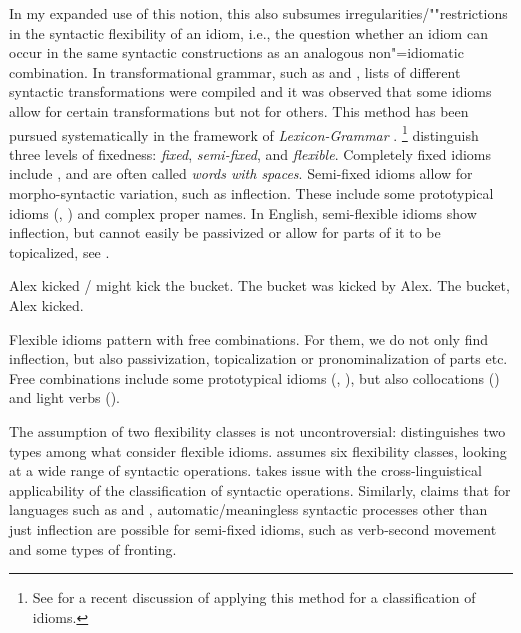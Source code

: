 \documentclass[output=paper]{langsci/langscibook}
\begin{document}
In my expanded use of this notion, this also subsumes irregularities/""restrictions in the syntactic flexibility of an idiom, i.e., the question whether an idiom can occur in the same syntactic constructions as an analogous non"=idiomatic combination. In transformational grammar, such as \cite{Weinreich:69} and \cite{Fraser:70}, lists of different syntactic transformations were compiled and it was observed that some idioms allow for certain transformations but not for others. This method has been pursued systematically in the framework of \emph{Lexicon-Grammar} \citep{Gross:75}.%
\footnote{See \cite{Laporte:18} for a recent discussion of applying this method for a classification of idioms.}
%
\cite{SBBCF2002a-ausgedruckt} distinguish three levels of fixedness: \emph{fixed}, \emph{semi-fixed}, and \emph{flexible}. 
Completely fixed idioms include ,  and are often called \emph{words with spaces}.
Semi-fixed idioms allow for morpho-syntactic variation, such as inflection. These include some prototypical idioms (, ) and complex proper names. In English, semi-flexible idioms show inflection, but cannot easily be passivized or allow for parts of it to be topicalized, see .

\eal \label{kick-ex} 
\ex Alex kicked / might kick the bucket.
\ex *The bucket was kicked by Alex.
\ex *The bucket, Alex kicked.
\zl 



Flexible idioms pattern with free combinations. For them, we do not only find inflection, but also passivization, topicalization or pronominalization of parts etc. Free combinations include some prototypical idioms (, ), but also collocations () and light verbs ().

The assumption of two flexibility classes is not uncontroversial: 
\cite{Horn:03} distinguishes two types among what \cite{SBBCF2002a-ausgedruckt} consider flexible idioms. 
\cite{Fraser:70} assumes six flexibility classes, looking at a wide range of syntactic operations.
\cite{Ruwet:91} takes issue with the cross-linguistical applicability of the classification of syntactic operations. Similarly, \cite{Schenk:95} claims that for languages such as  and , automatic/meaningless syntactic processes other than just inflection are possible for semi-fixed idioms, such as verb-second movement and some types of fronting.
\end{document}

